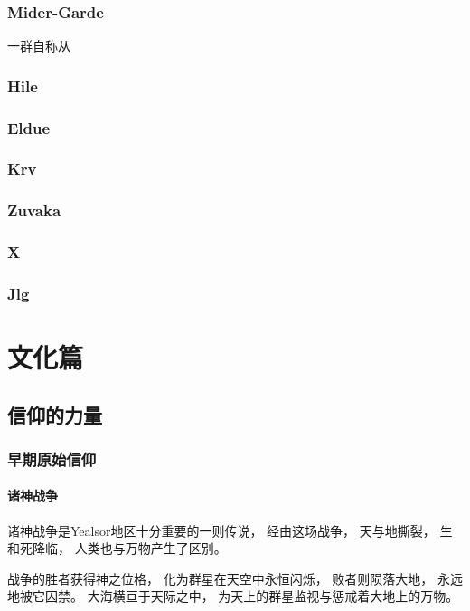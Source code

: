 \documentclass[UTF8,12pt,draft]{ctexbook}
\begin{document}
            \section{Mider-Garde}
                一群自称从

            \section{Hile}

            \section{Eldue}

            \section{Krv}

            \section{Zuvaka}

            \section{X}

            \section{Jlg}
\part{文化篇}
    \chapter{信仰的力量}
        \section{早期原始信仰}
            \subsection{诸神战争}
                诸神战争是Yealsor地区十分重要的一则传说，
                经由这场战争，
                天与地撕裂，
                生和死降临，
                人类也与万物产生了区别。

                战争的胜者获得神之位格，
                化为群星在天空中永恒闪烁，
                败者则陨落大地，
                永远地被它囚禁。
                大海横亘于天际之中，
                为天上的群星监视与惩戒着大地上的万物。
\end{document}
